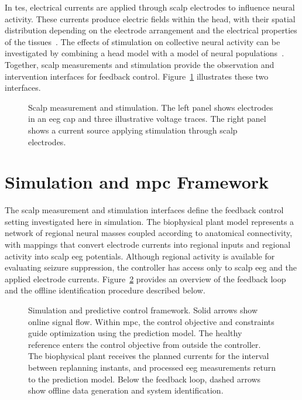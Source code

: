 In \ac{tes}, electrical currents are applied through scalp electrodes to influence neural activity.
These currents produce electric fields within the head, with their spatial distribution depending on the electrode arrangement and the electrical properties of the tissues~\cite{Huang2019}.
The effects of stimulation on collective neural activity can be investigated by combining a head model with a model of neural populations~\cite{Merlet2013,Kunze2016}.
Together, scalp measurements and stimulation provide the observation and intervention interfaces for feedback control.
Figure~\ref{fig:scalp_interfaces} illustrates these two interfaces.

\begin{figure}
    \centering
    
    \caption{Scalp measurement and stimulation.
    The left panel shows electrodes in an \acs{eeg} cap and three illustrative voltage traces.
    The right panel shows a current source applying stimulation through scalp electrodes.}\label{fig:scalp_interfaces}
\end{figure}

\section{Simulation and \acs{mpc} Framework}\label{sec:control_engineering_setting}

The scalp measurement and stimulation interfaces define the feedback control setting investigated here in simulation.
The biophysical plant model represents a network of regional neural masses coupled according to anatomical connectivity, with mappings that convert electrode currents into regional inputs and regional activity into scalp \ac{eeg} potentials.
Although regional activity is available for evaluating seizure suppression, the controller has access only to scalp \ac{eeg} and the applied electrode currents.
Figure~\ref{fig:control_setting} provides an overview of the feedback loop and the offline identification procedure described below.

\begin{figure}[!t] %
    \centering
    
    \caption{Simulation and predictive control framework.
    Solid arrows show online signal flow.
    Within \acs{mpc}, the control objective and constraints guide optimization using the prediction model.
    The healthy reference enters the control objective from outside the controller.
    The biophysical plant receives the planned currents for the interval between replanning instants, and processed \acs{eeg} measurements return to the prediction model.
    Below the feedback loop, dashed arrows show offline data generation and system identification.}\label{fig:control_setting}
\end{figure}

